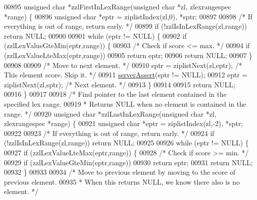 \begin{DoxyCode}
00895 \textcolor{keywordtype}{unsigned} \textcolor{keywordtype}{char} *zzlFirstInLexRange(\textcolor{keywordtype}{unsigned} \textcolor{keywordtype}{char} *zl, zlexrangespec *range) \{
00896     \textcolor{keywordtype}{unsigned} \textcolor{keywordtype}{char} *eptr = ziplistIndex(zl,0), *sptr;
00897 
00898     \textcolor{comment}{/* If everything is out of range, return early. */}
00899     \textcolor{keywordflow}{if} (!zzlIsInLexRange(zl,range)) \textcolor{keywordflow}{return} NULL;
00900 
00901     \textcolor{keywordflow}{while} (eptr != NULL) \{
00902         \textcolor{keywordflow}{if} (zzlLexValueGteMin(eptr,range)) \{
00903             \textcolor{comment}{/* Check if score <= max. */}
00904             \textcolor{keywordflow}{if} (zzlLexValueLteMax(eptr,range))
00905                 \textcolor{keywordflow}{return} eptr;
00906             \textcolor{keywordflow}{return} NULL;
00907         \}
00908 
00909         \textcolor{comment}{/* Move to next element. */}
00910         sptr = ziplistNext(zl,eptr); \textcolor{comment}{/* This element score. Skip it. */}
00911         \hyperlink{server_8h_a88114b5169b4c382df6b56506285e56a}{serverAssert}(sptr != NULL);
00912         eptr = ziplistNext(zl,sptr); \textcolor{comment}{/* Next element. */}
00913     \}
00914 
00915     \textcolor{keywordflow}{return} NULL;
00916 \}
00917 
00918 \textcolor{comment}{/* Find pointer to the last element contained in the specified lex range.}
00919 \textcolor{comment}{ * Returns NULL when no element is contained in the range. */}
00920 \textcolor{keywordtype}{unsigned} \textcolor{keywordtype}{char} *zzlLastInLexRange(\textcolor{keywordtype}{unsigned} \textcolor{keywordtype}{char} *zl, zlexrangespec *range) \{
00921     \textcolor{keywordtype}{unsigned} \textcolor{keywordtype}{char} *eptr = ziplistIndex(zl,-2), *sptr;
00922 
00923     \textcolor{comment}{/* If everything is out of range, return early. */}
00924     \textcolor{keywordflow}{if} (!zzlIsInLexRange(zl,range)) \textcolor{keywordflow}{return} NULL;
00925 
00926     \textcolor{keywordflow}{while} (eptr != NULL) \{
00927         \textcolor{keywordflow}{if} (zzlLexValueLteMax(eptr,range)) \{
00928             \textcolor{comment}{/* Check if score >= min. */}
00929             \textcolor{keywordflow}{if} (zzlLexValueGteMin(eptr,range))
00930                 \textcolor{keywordflow}{return} eptr;
00931             \textcolor{keywordflow}{return} NULL;
00932         \}
00933 
00934         \textcolor{comment}{/* Move to previous element by moving to the score of previous element.}
00935 \textcolor{comment}{         * When this returns NULL, we know there also is no element. */}

\end{DoxyCode}

